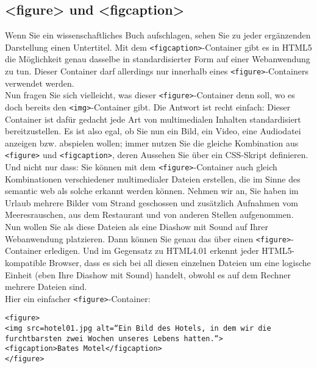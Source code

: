 \subsection{<figure> und <figcaption>}

Wenn Sie ein wissenschaftliches Buch aufschlagen, sehen Sie zu jeder ergänzenden Darstellung einen Untertitel. Mit dem \verb|<figcaption>|-Container gibt es in HTML5 die Möglichkeit genau dasselbe in standardisierter Form auf einer Webanwendung zu tun. Dieser Container darf allerdings nur innerhalb eines \verb|<figure>|-Containers verwendet werden.\\

Nun fragen Sie sich vielleicht, was dieser \verb|<figure>|-Container denn soll, wo es doch bereits den \verb|<img>|-Container gibt. Die Antwort ist recht einfach: Dieser Container ist dafür gedacht jede Art von multimedialen Inhalten standardisiert bereitzustellen. Es ist also egal, ob Sie nun ein Bild, ein Video, eine Audiodatei anzeigen bzw. abspielen wollen; immer nutzen Sie die gleiche Kombination aus \verb|<figure>| und \verb|<figcaption>|, deren Aussehen Sie über ein CSS-Skript definieren.\\

Und nicht nur dass: Sie können mit dem \verb|<figure>|-Container auch gleich Kombinationen verschiedener multimedialer Dateien erstellen, die im Sinne des semantic web als solche erkannt werden können. Nehmen wir an, Sie haben im Urlaub mehrere Bilder vom Strand geschossen und zusätzlich Aufnahmen vom Meeresrauschen, aus dem Restaurant und von anderen Stellen aufgenommen. Nun wollen Sie als diese Dateien als eine Diashow mit Sound auf Ihrer Webanwendung platzieren. Dann können Sie genau das über einen \verb|<figure>|-Container erledigen. Und im Gegensatz zu HTML4.01 erkennt jeder HTML5-kompatible Browser, dass es sich bei all diesen einzelnen Dateien um eine logische Einheit (eben Ihre Diashow mit Sound) handelt, obwohl es auf dem Rechner mehrere Dateien sind.\\

Hier ein einfacher \verb|<figure>|-Container:\\

\begin{verbatim}
<figure>
<img src=hotel01.jpg alt=“Ein Bild des Hotels, in dem wir die furchtbarsten zwei Wochen unseres Lebens hatten.“>
<figcaption>Bates Motel</figcaption>
</figure>
\end{verbatim}

